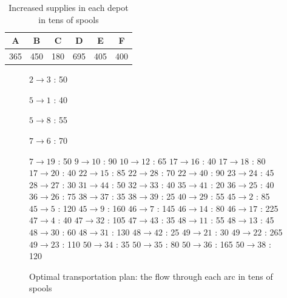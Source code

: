 \begin{table}[H]
\centering
\begin{tabular}{|c|c|c|c|c|c|}
\hline
A & B & C & D & E & F \\ \hline
365 & 450 & 180 & 695 & 405 & 400  \\ \hline
\end{tabular}
\caption{Increased supplies in each depot in tens of spools}
\label{increased-supplies}
\end{table}

\begin{figure}[H]
\centering
\begin{multicols}{5}
$ 2 \rightarrow 3 $ : 50

$ 5 \rightarrow 1 $ : 40

$ 5 \rightarrow 8 $ : 55

$ 7 \rightarrow 6 $ : 70

$ 7 \rightarrow 19 $ : 50
$ 9 \rightarrow 10 $ : 90
$ 10 \rightarrow 12 $ : 65
$ 17 \rightarrow 16 $ : 40
$ 17 \rightarrow 18 $ : 80
$ 17 \rightarrow 20 $ : 40
$ 22 \rightarrow 15 $ : 85
$ 22 \rightarrow 28 $ : 70
$ 22 \rightarrow 40 $ : 90
$ 23 \rightarrow 24 $ : 45
$ 28 \rightarrow 27 $ : 30
$ 31 \rightarrow 44 $ : 50
$ 32 \rightarrow 33 $ : 40
$ 35 \rightarrow 41 $ : 20
$ 36 \rightarrow 25 $ : 40
$ 36 \rightarrow 26 $ : 75
$ 38 \rightarrow 37 $ : 35
$ 38 \rightarrow 39 $ : 25
$ 40 \rightarrow 29 $ : 55
$ 45 \rightarrow 2 $ : 85
$ 45 \rightarrow 5 $ : 120
$ 45 \rightarrow 9 $ : 160
$ 46 \rightarrow 7 $ : 145
$ 46 \rightarrow 14 $ : 80
$ 46 \rightarrow 17 $ : 225
$ 47 \rightarrow 4 $ : 40
$ 47 \rightarrow 32 $ : 105
$ 47 \rightarrow 43 $ : 35
$ 48 \rightarrow 11 $ : 55
$ 48 \rightarrow 13 $ : 45
$ 48 \rightarrow 30 $ : 60
$ 48 \rightarrow 31 $ : 130
$ 48 \rightarrow 42 $ : 25
$ 49 \rightarrow 21 $ : 30
$ 49 \rightarrow 22 $ : 265
$ 49 \rightarrow 23 $ : 110
$ 50 \rightarrow 34 $ : 35
$ 50 \rightarrow 35 $ : 80
$ 50 \rightarrow 36 $ : 165
$ 50 \rightarrow 38 $ : 120
\end{multicols}
\caption{Optimal transportation plan: the flow through each arc in tens of spools}
\label{flow3-2c}
\end{figure}

